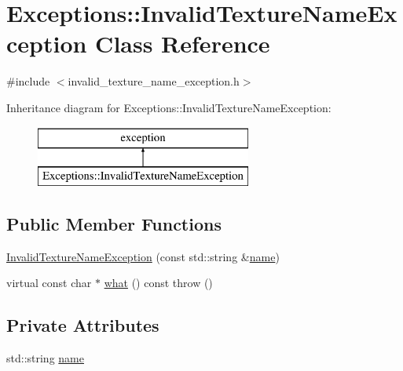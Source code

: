 \hypertarget{class_exceptions_1_1_invalid_texture_name_exception}{}\section{Exceptions\+:\+:Invalid\+Texture\+Name\+Exception Class Reference}
\label{class_exceptions_1_1_invalid_texture_name_exception}


{\ttfamily \#include $<$invalid\+\_\+texture\+\_\+name\+\_\+exception.\+h$>$}

Inheritance diagram for Exceptions\+:\+:Invalid\+Texture\+Name\+Exception\+:\begin{figure}[H]
\begin{center}
\leavevmode
\includegraphics[height=2.000000cm]{class_exceptions_1_1_invalid_texture_name_exception}
\end{center}
\end{figure}
\subsection*{Public Member Functions}
\begin{DoxyCompactItemize}
\item 
\hyperlink{class_exceptions_1_1_invalid_texture_name_exception_a199fa95644139d5f439512588a7dca11}{Invalid\+Texture\+Name\+Exception} (const std\+::string \&\hyperlink{class_exceptions_1_1_invalid_texture_name_exception_a01142eb79f940de4fb5989df146716f1}{name})
\item 
virtual const char $\ast$ \hyperlink{class_exceptions_1_1_invalid_texture_name_exception_aabe515c7a32d71fa42951c0b1e0eaf14}{what} () const   throw ()
\end{DoxyCompactItemize}
\subsection*{Private Attributes}
\begin{DoxyCompactItemize}
\item 
std\+::string \hyperlink{class_exceptions_1_1_invalid_texture_name_exception_a01142eb79f940de4fb5989df146716f1}{name}
\end{DoxyCompactItemize}


